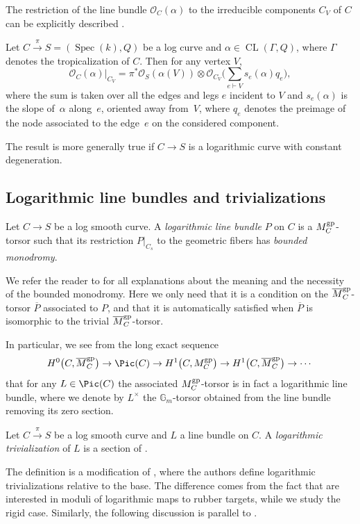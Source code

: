 The restriction of the line bundle $\mathcal O_C(\alpha)$ to the irreducible components $C_V$ of $C$ can be explicitly described \cite[Proposition~3.3.3]{marcuswiselog}.
\begin{prop}
 Let $C\xrightarrow{\pi} S=(\operatorname{Spec}(k),Q)$ be a log curve and $\alpha\in\operatorname{CL}(\Gamma, Q)$, where $\Gamma$ denotes the tropicalization of $C$. Then for any vertex $V$,
 \[\mathcal O_C(\alpha)\rvert_{C_V}=\pi^*\mathcal O_S(\alpha(V))\otimes\mathcal O_{C_V}\biggl(\sum_{e\vdash V} s_e(\alpha) q_e\biggr),
 \]
where the sum is taken over all the edges and legs $e$ incident to $V$ and $s_e(\alpha)$ is the slope of~$\alpha$ along~$e$, oriented away from~$V$, where $q_e$ denotes the preimage of the node associated to the edge~$e$ on the considered component.
\end{prop}
\begin{remarkk}
 The result is more generally true if $C\to S$ is a logarithmic curve with constant degeneration.
\end{remarkk}

\subsection{Logarithmic line bundles and trivializations}
\begin{defi}
 Let $C\to S$ be a log smooth curve. A \emph{logarithmic line bundle} $P$ on $C$ is a $M_C^{\rm gp}$-torsor such that its restriction $P\rvert_{C_s}$ to the geometric fibers has \emph{bounded monodromy}.
\end{defi}
We refer the reader to \cite{molchowiselog} for all explanations about the meaning and the necessity of the bounded monodromy. Here we only need that it is a condition on the $\overline{M}_C^{\rm gp}$-torsor $\overline{P}$ associated to $P$, and that it is automatically satisfied when $\overline{P}$ is isomorphic to the trivial $\overline{M}_C^{\rm gp}$-torsor.

In particular, we see from the long exact sequence
\[H^0\bigl(C,\overline{M}_C^{\rm gp}\bigr)\to\Pic(C)\to H^1\bigl(C,M_C^{\rm gp}\bigr)\to H^1\bigl(C,\overline{M}_C^{\rm gp}\bigr)\to\cdots\]
that for any $L\in \Pic(C)$ the associated $M_C^{\rm gp}$-torsor  is in fact a logarithmic line bundle, where we denote by $L^{\times}$ the $\mathbb{G}_m$-torsor obtained from the line bundle removing its zero section.

\begin{defi}
 Let $C\xrightarrow{\pi} S$ be a log smooth curve and $L$ a line bundle on $C$. A \emph{logarithmic trivialization} of $L$ is a section of .
\end{defi}
The definition is a modification of \cite[Definition~4.5.1]{marcuswiselog}, where the authors define logarithmic trivializations relative to the base. The difference comes from the fact that \cite{marcuswiselog} are interested in moduli of logarithmic maps to rubber targets, while we study the rigid case.
Similarly, the following discussion is parallel to
\cite[Proposition~4.5.3]{marcuswiselog}.

